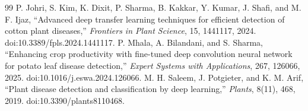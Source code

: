 \documentclass[a4paper,fleqn]{cas-dc}
\begin{document}
\begin{thebibliography}{99}
 P. Johri, S. Kim, K. Dixit, P. Sharma, B. Kakkar, Y. Kumar, J. Shafi, and M. F. Ijaz, ``Advanced deep transfer learning techniques for efficient detection of cotton plant diseases,'' \textit{Frontiers in Plant Science}, 15, 1441117, 2024. doi:10.3389/fpls.2024.1441117.
 P. Mhala, A. Bilandani, and S. Sharma, ``Enhancing crop productivity with fine-tuned deep convolution neural network for potato leaf disease detection,'' \textit{Expert Systems with Applications}, 267, 126066, 2025. doi:10.1016/j.eswa.2024.126066.
 M. H. Saleem, J. Potgieter, and K. M. Arif, ``Plant disease detection and classification by deep learning,'' \textit{Plants}, 8(11), 468, 2019. doi:10.3390/plants8110468.
\end{thebibliography}
\end{document}

